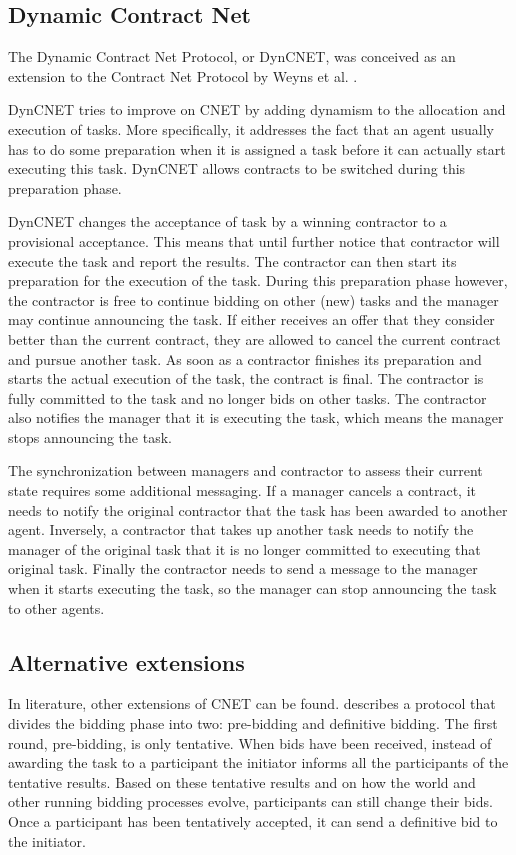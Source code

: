 \documentclass[10pt,a4paper,twocolumn]{article}
\begin{document}
\subsection{Dynamic Contract Net}
The Dynamic Contract Net Protocol, or DynCNET, was conceived as an extension to the Contract Net Protocol by Weyns et al. \cite{DynCNET, weyns2007dyncnet, DBLP:conf/eumas/WeynsBHS06}. 

DynCNET tries to improve on CNET by adding dynamism to the allocation and execution of tasks. More specifically, it addresses the fact that an agent usually has to do some preparation when it is assigned a task before it can actually start executing this task. DynCNET allows contracts to be switched during this preparation phase.

DynCNET changes the acceptance of task by a winning contractor to a provisional acceptance. This means that until further notice that contractor will execute the task and report the results. The contractor can then start its preparation for the execution of the task. During this preparation phase however, the contractor is free to continue bidding on other (new) tasks and the manager may continue announcing the task. If either receives an offer that they consider better than the current contract, they are allowed to cancel the current contract and pursue another task. As soon as a contractor finishes its preparation and starts the actual execution of the task, the contract is final. The contractor is fully committed to the task and no longer bids on other tasks. The contractor also notifies the manager that it is executing the task, which means the manager stops announcing the task.

The synchronization between managers and contractor to assess their current state requires some additional messaging. If a manager cancels a contract, it needs to notify the original contractor that the task has been awarded to another agent. Inversely, a contractor that takes up another task needs to notify the manager of the original task that it is no longer committed to executing that original task. Finally the contractor needs to send a message to the manager when it starts executing the task, so the manager can stop announcing the task to other agents.

\subsection{Alternative extensions}
In literature, other extensions of CNET can be found. \cite{TentativeBidding} describes a protocol that divides the bidding phase into two: pre-bidding and definitive bidding. The first round, pre-bidding, is only tentative. When bids have been received, instead of awarding the task to a participant the initiator informs all the participants of the tentative results. Based on these tentative results and on how the world and other running bidding processes evolve, participants can still change their bids. Once a participant has been tentatively accepted, it can send a definitive bid to the initiator.
\end{document}
